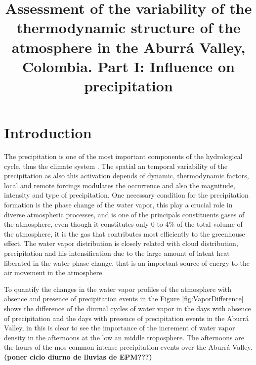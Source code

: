 \documentclass{ametsoc}
\title{Assessment of the variability of the thermodynamic structure of the atmosphere in the Aburrá Valley, Colombia. Part I: Influence on precipitation}
\affiliation{Universidad Nacional de Colombia, Medellín, Colombia}
\begin{document}
\maketitle


%

\section{Introduction}
The precipitation is one of the most important components of the hydrological cycle, thus the climate system \citep{davies2011global}. The spatial an temporal variability of the precipitation as also this activation depends of dynamic, thermodynamic factors, local and remote forcings modulates the occurrence and also the magnitude, intensity and type of precipitation. One necessary condition for the precipitation formation is the phase change of the water vapor, this play a crucial role in diverse atmospheric processes, and is one of the principals constituents gases of the atmosphere, even though it constitutes only 0 to 4\% of the total volume of the atmosphere, it is the gas that contributes most efficiently to the greenhouse effect. The water vapor distribution is closely related with cloud distribution, precipitation and his intensification due to the large amount of latent heat liberated in the water phase change, that is an important source of energy to the air movement in the atmosphere.


To quantify the changes in the water vapor profiles of the atmosphere with absence and presence of precipitation events in the Figure \ref{fig:VaporDifference} shows the difference of the diurnal cycles of water vapor in the days with absence of precipitation and the days with presence of precipitation events in the Aburr\'a Valley, in this is clear to see the importance of the increment of water vapor density in the afternoons at the low an middle troposphere. The afternoons are the  hours of the mos common intense precipitation events over the Aburr\'a Valley. \textbf{ (poner ciclo diurno de lluvias de EPM???)}
\end{document}
